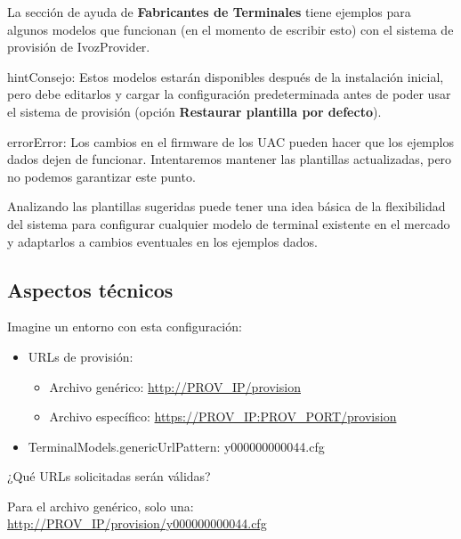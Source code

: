 \documentclass[letterpaper,10pt,spanish]{sphinxmanual}
\begin{document}
La sección de ayuda de \textbf{Fabricantes de Terminales} tiene ejemplos para algunos modelos que funcionan (en el momento de escribir esto) con el sistema de provisión de IvozProvider.

\begin{notice}{hint}{Consejo:}
Estos modelos estarán disponibles después de la instalación inicial, pero debe editarlos y cargar la configuración predeterminada antes de poder usar el sistema de provisión (opción \textbf{Restaurar plantilla por defecto}).
\end{notice}

\begin{notice}{error}{Error:}
Los cambios en el firmware de los UAC pueden hacer que los ejemplos dados dejen de funcionar. Intentaremos mantener las plantillas actualizadas, pero no podemos garantizar este punto.
\end{notice}

Analizando las plantillas sugeridas puede tener una idea básica de la flexibilidad del sistema para configurar cualquier modelo de terminal existente en el mercado y adaptarlos a cambios eventuales en los ejemplos dados.


\subsection{Aspectos técnicos}
\label{administration_portal/platform/terminal_manufacturers:getting-technical}
Imagine un entorno con esta configuración:
\begin{itemize}
\item {} 
URLs de provisión:
\begin{itemize}
\item {} 
Archivo genérico: \url{http://PROV\_IP/provision}

\item {} 
Archivo específico: \url{https://PROV\_IP:PROV\_PORT/provision}

\end{itemize}

\item {} 
TerminalModels.genericUrlPattern: y000000000044.cfg

\end{itemize}

¿Qué URLs solicitadas serán válidas?

Para el archivo genérico, solo una: \url{http://PROV\_IP/provision/y000000000044.cfg}
\end{document}
